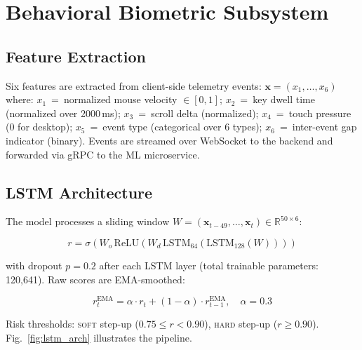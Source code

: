 \documentclass[journal,twoside,10pt]{IEEEtran}
\begin{document}
\section{Behavioral Biometric Subsystem}
\label{sec:behavioral}

\subsection{Feature Extraction}

Six features are extracted from client-side telemetry events:
$\mathbf{x} = (x_1, \ldots, x_6)$ where:
$x_1$~=~normalized mouse velocity $\in [0,1]$;
$x_2$~=~key dwell time (normalized over 2000\,ms);
$x_3$~=~scroll delta (normalized);
$x_4$~=~touch pressure (0 for desktop);
$x_5$~=~event type (categorical over 6 types);
$x_6$~=~inter-event gap indicator (binary).
Events are streamed over WebSocket to the backend and forwarded via gRPC
to the ML microservice.

\subsection{LSTM Architecture}

The model processes a sliding window
$W = (\mathbf{x}_{t-49}, \ldots, \mathbf{x}_t) \in \mathbb{R}^{50 \times 6}$:

\begin{equation}
  r = \sigma\!\left(W_o\,\mathrm{ReLU}\!\left(W_d\,
      \mathrm{LSTM}_{64}\!\left(\mathrm{LSTM}_{128}(W)\right)\right)\right)
  \label{eq:lstm}
\end{equation}

\noindent with dropout $p = 0.2$ after each LSTM layer (total trainable
parameters: 120,641). Raw scores are EMA-smoothed:

\begin{equation}
  r_t^{\text{EMA}} = \alpha \cdot r_t + (1-\alpha) \cdot r_{t-1}^{\text{EMA}},
  \quad \alpha = 0.3
  \label{eq:ema}
\end{equation}

Risk thresholds: \textsc{soft} step-up ($0.75 \leq r < 0.90$), \textsc{hard}
step-up ($r \geq 0.90$). Fig.~\ref{fig:lstm_arch} illustrates the pipeline.
\end{document}
